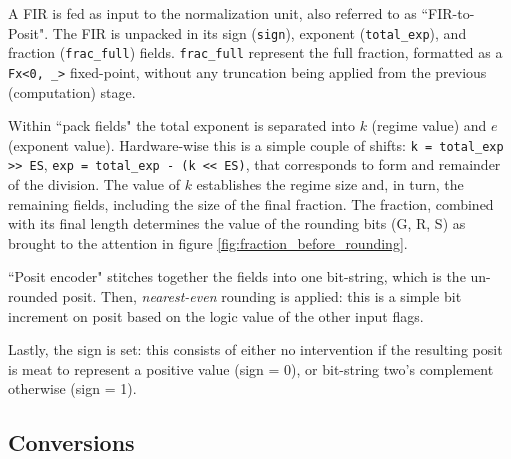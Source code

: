 A FIR is fed as input to the normalization unit, also referred to as ``FIR-to-Posit".
The FIR is unpacked in its sign (\texttt{sign}), exponent (\texttt{total\_exp}), and fraction (\texttt{frac\_full}) fields.
\texttt{frac\_full} represent the full fraction, formatted as a \texttt{Fx<0, \_>} fixed-point, without any truncation being applied from the previous (computation) stage.

Within ``pack fields" the total exponent is separated into $k$ (regime value) and $e$ (exponent value). Hardware-wise this is a simple couple of shifts: \texttt{k = total\_exp >> ES}, \texttt{exp = total\_exp - (k << ES)}, that corresponds to form and remainder of the division.
The value of $k$ establishes the regime size and, in turn, the remaining fields, including the size of the final fraction. 
The fraction, combined with its final length determines the value of the rounding bits (G, R, S) as brought to the attention in figure \ref{fig:fraction_before_rounding}.

``Posit encoder" stitches together the fields into one bit-string, which is the un-rounded posit.
Then, \textit{nearest-even} rounding is applied: this is a simple bit increment on posit based on the logic value of the other input flags.

Lastly, the sign is set: this consists of either no intervention if the resulting posit is meat to represent a positive value (sign = 0), or bit-string two's complement otherwise (sign = 1).



\subsection{Conversions}







